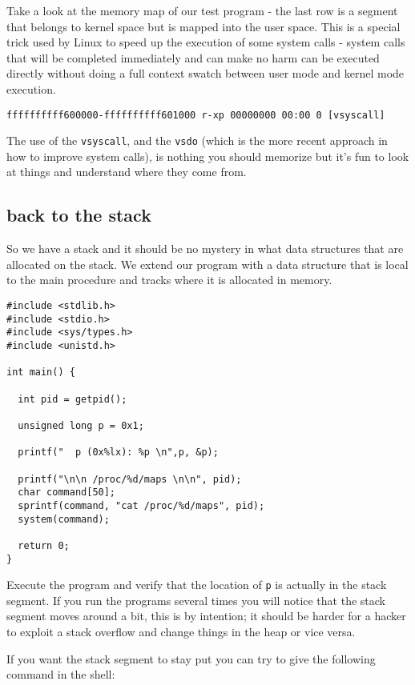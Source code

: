 \documentclass[a4paper,11pt]{article}
\begin{document}
Take a look at the memory map of our test program - the last row is a
segment that belongs to kernel space but is mapped into the user
space. This is a special trick used by Linux to speed up the execution
of some system calls - system calls that will be completed immediately
and can make no harm can be executed directly without doing a full
context swatch between user mode and kernel mode execution.

\begin{verbatim}
ffffffffff600000-ffffffffff601000 r-xp 00000000 00:00 0 [vsyscall]
\end{verbatim}

The use of the {\tt vsyscall}, and the {\tt vsdo} (which is the more
recent approach in how to improve system calls), is nothing you should
memorize but it's fun to look at things and understand where they come
from.

\subsection{back to the stack}

So we have a stack and it should be no mystery in what data structures
that are allocated on the stack. We extend our program with a data
structure that is local to the main procedure and tracks where it is
allocated in memory.

\begin{lstlisting}
#include <stdlib.h>
#include <stdio.h>
#include <sys/types.h>
#include <unistd.h>

int main() {

  int pid = getpid();
  
  unsigned long p = 0x1;

  printf("  p (0x%lx): %p \n",p, &p);

  printf("\n\n /proc/%d/maps \n\n", pid);
  char command[50];
  sprintf(command, "cat /proc/%d/maps", pid);
  system(command);  

  return 0;
}
\end{lstlisting}

Execute the program and verify that the location of {\tt p} is
actually in the stack segment. If you run the programs several times
you will notice that the stack segment moves around a bit, this is by
intention; it should be harder for a hacker to exploit a stack
overflow and change things in the heap or vice versa.

If you want the stack segment to stay put you can try to give the
following command in the shell:
\end{document}

